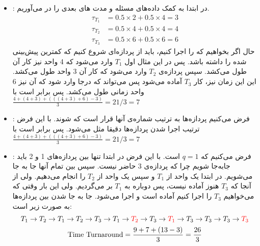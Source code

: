 \begin{itemize}
    \item \textbf{}:
    در ابتدا به کمک داده‌های مسئله و
    مدت
    های
    بعدی را در می‌آوریم.
    \begin{align*}
        \tau_{T_1} &= 0.5 \times 2 + 0.5 \times 4 = 3\\
        \tau_{T_2} &= 0.5 \times 4 + 0.5 \times 4 = 4\\
        \tau_{T_3} &= 0.5 \times 6 + 0.5 \times 6 = 6
    \end{align*}
    حال اگر بخواهیم که
    را اجرا کنیم، باید از پردازه‌ای شروع کنیم که کمترین
    پیش‌بینی شده را داشته باشد. پس در این مثال اول
    $T_1$
    وارد
    می‌شود که 4 واحد نیز کار آن طول می‌کشد. سپس پردازه‌ی
    $T_2$
    وارد می‌شود که کار آن 3 واحد طول می‌کشد. این این زمان نیز، کار
    $T_3$
    آماده می‌شود پس می‌تواند که درجا وارد
    شود که آن نیز 6 واحد زمانی طول می‌کشد.
    پس
    برابر است با
    $\frac{4 + (4 + 3) + (((4 + 3) + 6) - 3)}{3} = 21/3 = 7$
    \item \textbf{}:
    فرض می‌کنیم پردازه‌ها به ترتیب شماره‌ی آنها قرار است که
    شوند. با این فرض ترتیب اجرا شدن پردازه‌ها دقیقا مثل
    می‌شود. پس
    برابر است با
    $\frac{4 + (4 + 3) + (((4 + 3) + 6) - 3)}{3} = 21/3 = 7$
    \item \textbf{}: فرض می‌کنیم که
    $q = 1$
    است. با این فرض در ابتدا تنها بین پردازه‌های 1 و 2 باید جابه‌جا شویم چرا که پردازه‌ی 3 حاضر نیست.
    سپس بین تمام آنها جا به جا می‌شویم.
    در ابتدا یک واحد از
    $T_1$ و سپس یک واحد از $T_2$
    را انجام می‌دهیم. ولی از آنجا که
    $T_3$
    هنوز آماده نیست، پس دوباره به
    $T_1$
    بر می‌گردیم. ولی این بار وقتی که می‌خواهیم
    $T_3$
    را اجرا کنیم آماده است و اجرا می‌شود. جا به جا شدن بین پردازه‌ها به صورت زیر است:
    \begin{gather*}
        T_1 \rightarrow T_2 \rightarrow
        T_1 \rightarrow T_2 \rightarrow T_3 \rightarrow
        T_1 \rightarrow \textcolor{red}{T_2} \rightarrow T_3 \rightarrow
        \textcolor{red}{T_1} \rightarrow T_3
        \rightarrow T_3 \rightarrow T_3 \rightarrow \textcolor{red}{T_3}
        \\
        \text{Time Turnaround} = \frac{9 + 7 + (13 - 3)}{3} = \frac{26}{3}
    \end{gather*}
\end{itemize}



